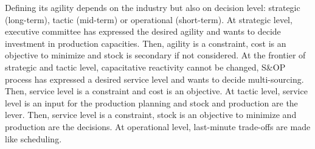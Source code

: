 Defining its agility depends on the industry but also on decision level: strategic (long-term), tactic (mid-term) or operational (short-term).
At strategic level, executive committee has expressed the desired agility and wants to decide investment in production capacities.
Then, agility is a constraint, cost is an objective to minimize and stock is secondary if not considered.
At the frontier of strategic and tactic level, capacitative reactivity cannot be changed, S\&OP process has expressed a desired service level and wants to decide multi-sourcing.
Then, service level is a constraint and cost is an objective.
At tactic level, service level is an input for the production planning and stock and production are the lever.
Then, service level is a constraint, stock is an objective to minimize and production are the decisions.
At operational level, last-minute trade-offs are made like scheduling.









